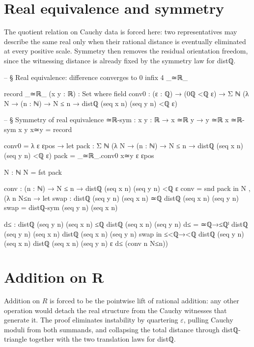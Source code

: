 \documentclass[11pt,a4paper]{book}
\def\mathbb#1{#1}%
\def\texttt#1{#1}%
\def\texorpdfstring#1#2{#2}%
\begin{document}
\section{Real equivalence and symmetry}

The quotient relation on Cauchy data is forced here: two representatives may describe the same real only when their rational distance is eventually eliminated at every positive scale. Symmetry then removes the residual orientation freedom, since the witnessing distance is already fixed by the symmetry law for \texttt{distℚ}.

\begin{code}
-- § Real equivalence: difference converges to 0
infix 4 _≃ℝ_

record _≃ℝ_ (x y : ℝ) : Set where
  field
    conv0 : (ε : ℚ) → (0ℚ <ℚ ε) → Σ ℕ (λ N → (n : ℕ) → N ≤ n → distℚ (seq x n) (seq y n) <ℚ ε)

-- § Symmetry of real equivalence
≃ℝ-sym : {x y : ℝ} → x ≃ℝ y → y ≃ℝ x
≃ℝ-sym {x} {y} x≃y = record
  { conv0 = λ ε εpos →
      let
        pack : Σ ℕ (λ N → (n : ℕ) → N ≤ n → distℚ (seq x n) (seq y n) <ℚ ε)
        pack = _≃ℝ_.conv0 x≃y ε εpos

        N : ℕ
        N = fst pack

        conv : (n : ℕ) → N ≤ n → distℚ (seq x n) (seq y n) <ℚ ε
        conv = snd pack
      in
      N , (λ n N≤n →
        let
          swap : distℚ (seq y n) (seq x n) ≃ℚ distℚ (seq x n) (seq y n)
          swap = distℚ-sym (seq y n) (seq x n)

          d≤ : distℚ (seq y n) (seq x n) ≤ℚ distℚ (seq x n) (seq y n)
          d≤ = ≃ℚ→≤ℚˡ {distℚ (seq y n) (seq x n)} {distℚ (seq x n) (seq y n)} swap
        in
        ≤<ℚ→<ℚ {distℚ (seq y n) (seq x n)} {distℚ (seq x n) (seq y n)} {ε} d≤ (conv n N≤n))
  }
\end{code}


\section{Addition on \texorpdfstring{$\mathbb{R}$}{R}}

Addition on $\mathbb{R}$ is forced to be the pointwise lift of rational addition: any other operation would detach the real structure from the Cauchy witnesses that generate it. The proof eliminates instability by quartering $\varepsilon$, pulling Cauchy moduli from both summands, and collapsing the total distance through \texttt{distℚ-triangle} together with the two translation laws for \texttt{distℚ}.
\end{document}
